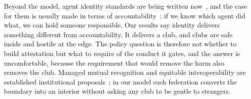 Beyond the model, agent identity standards are being written
now~\citep{a2a2026spec,xu2026agentdid,grogan2025agentfacts}, and the case for
them is usually made in terms of
accountability~\citep{south2025delegation}: if we know which agent did what, we
can hold someone responsible. Our results say identity delivers something
different from accountability. It delivers a club, and clubs are safe inside
and hostile at the edge. The policy question is therefore not whether to build
attestation but what to require of the conduct it gates, and the answer is
uncomfortable, because the requirement that would remove the harm also removes
the club. Managed mutual recognition and equitable interoperability are
established institutional
proposals~\citep{nicolaidis2005transnational,scottmorton2023equitable}; in our
model such federation converts the boundary into an interior without asking any
club to be gentle to strangers.

